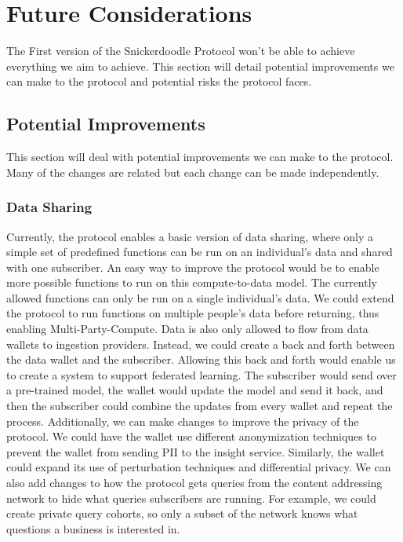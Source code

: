 \section{Future Considerations}
\label{section:Future}
The First version of the Snickerdoodle Protocol won't be able to achieve everything we aim to achieve. This section will detail potential improvements we can make to the protocol and potential risks the protocol faces.

\subsection{Potential Improvements}
This section will deal with potential improvements we can make to the protocol. Many of the changes are related but each change can be made independently.  

\subsubsection{Data Sharing}
Currently, the protocol enables a basic version of data sharing, where only a simple set of predefined functions can be run on an individual's data and shared with one subscriber. An easy way to improve the protocol would be to enable more possible functions to run on this compute-to-data model. The currently allowed functions can only be run on a single individual's data. We could extend the protocol to run functions on multiple people's data before returning, thus enabling Multi-Party-Compute. Data is also only allowed to flow from data wallets to ingestion providers. Instead, we could create a back and forth between the data wallet and the subscriber. Allowing this back and forth would enable us to create a system to support federated learning. The subscriber would send over a pre-trained model, the wallet would update the model and send it back, and then the subscriber could combine the updates from every wallet and repeat the process.
Additionally, we can make changes to improve the privacy of the protocol. We could have the wallet use different anonymization techniques to prevent the wallet from sending PII to the insight service. Similarly, the wallet could expand its use of perturbation techniques and differential privacy. We can also add changes to how the protocol gets queries from the content addressing network to hide what queries subscribers are running. For example, we could create private query cohorts, so only a subset of the network knows what questions a business is interested in.

